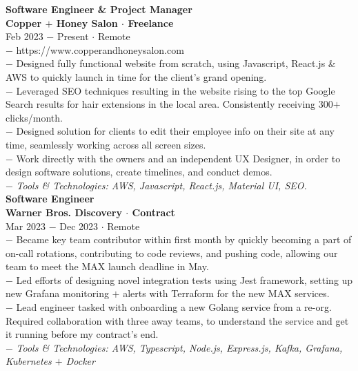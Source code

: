 \documentclass{resume}
\begin{document}
\begin{flushleft}
\normalsize{\bf Software Engineer \& Project Manager}\\
\footnotesize{\bf Copper $+$ Honey Salon $\cdot$ Freelance}\\
\footnotesize{Feb 2023 $-$ Present $\cdot$ Remote}\\[1mm]
{\scriptsize
	$-$ https://www.copperandhoneysalon.com\\
	$-$ Designed fully functional website from scratch, using Javascript, React.js \& AWS to quickly launch in time for the client's grand opening.\\
	$-$ Leveraged SEO techniques resulting in the website rising to the top Google Search results for hair extensions in the local area. Consistently receiving 300$+$ clicks/month.\\
	$-$ Designed solution for clients to edit their employee info on their site at any time, seamlessly working across all screen sizes.\\
	$-$ Work directly with the owners and an independent UX Designer, in order to design software solutions, create timelines, and conduct demos.\\
	$-$ \textit{Tools \& Technologies: AWS, Javascript, React.js, Material UI, SEO.}
}\\[3mm]

\normalsize{\bf Software Engineer}\\
\footnotesize{\bf Warner Bros. Discovery $\cdot$ Contract}\\
\footnotesize{Mar 2023 $-$ Dec 2023 $\cdot$ Remote}\\[1mm]
{\scriptsize
	$-$ Became key team contributor within first month by quickly becoming a part of on-call rotations, contributing to code reviews, and pushing code, allowing our team to meet the MAX launch deadline in May.\\
	$-$ Led efforts of designing novel integration tests using Jest framework, setting up new Grafana monitoring $+$ alerts with Terraform for the new MAX services.\\
	$-$ Lead engineer tasked with onboarding a new Golang service from a re-org. Required collaboration with three away teams, to understand the service and get it running before my contract's end.\\
	$-$ \textit{Tools \& Technologies: AWS, Typescript, Node.js, Express.js, Kafka, Grafana, Kubernetes $+$ Docker}
}\\[3mm]


\end{flushleft}
\end{document}
